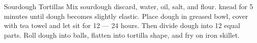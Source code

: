 \documentclass[../cookbook.tex]{subfiles}
\begin{document}
\begin{recipe}{Sourdough Tortillas}{}{}
    Mix sourdough discard, water, oil, salt, and flour.
    knead for 5 minutes until dough becomes slightly elastic.
    Place dough in greased bowl, cover with tea towel and let
    sit for 12 --- 24 hours. Then divide dough into 12 equal parts.
    Roll dough into balls, flatten into tortilla shape, and fry on
    iron skillet.
\end{recipe}
\end{document}
